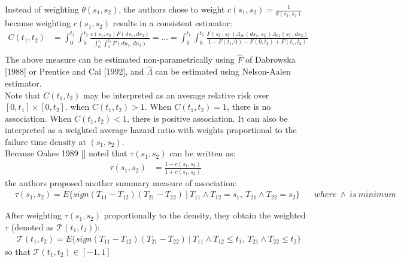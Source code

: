 \documentclass[]{article}
\begin{document}
Instead of weighting $\theta(s_1, s_2)$, the authors chose to weight $c(s_1, s_2) = \frac{1}{\theta(s_1, s_2)}$ because weighting $c(s_1, s_2)$ results in a consistent estimator:
	$$
	\begin{aligned}
		C(t_1, t_2) &= \int_0^{t_1}\int_0^{t_2} \frac{c(s_1, s_2)F(ds_1,ds_2)}{\int_0^{t_1}\int_0^{t_2} F(du_1, du_2)} = ...= \int_0^{t_1}\int_0^{t_2} \frac{F(s_1^-, s_2^-)\Lambda_{10}(ds_1, s^-_2)\Lambda_{01}(s^-_1, ds_2)}{1 - F(t_1, 0) - F(0, t_2)+ F(t_1, t_2)} \\
	\end{aligned}
	$$
	The above measure can be estimated non-parametrically using $\hat{F}$ of Dabrowska [1988] or Prentice and Cai [1992], and $\hat{\Lambda}$ can be estimated using Nelson-Aalen estimator.\\
	
Note that $C(t_1, t_2)$ may be interpreted as an average relative risk over $[0,t_1] \times [0, t_2]$. when $C(t_1, t_2)>1$. When $C(t_1, t_2)=1$, there is no association. When $C(t_1, t_2)<1$, there is positive association. It can also be interpreted as a weighted average hazard ratio with weights proportional to the failure time density at $(s_1,s_2)$.\\
	
Because Oakes 1989 [\cite{oakes1989bivariate}] noted that $\tau(s_1, s_2)$ can be written as:
	$$
	\begin{aligned}
		\tau(s_1, s_2) &= \frac{1 - c(s_1, s_2)}{1+c(s_1, s_2)}
	\end{aligned}
	$$
	the authors proposed another summary measure of association:
	$$
	\begin{aligned}
		&\tau(s_1, s_2) = E\{sign(T_{11} - T_{12}) (T_{21} - T_{22})~|~ T_{11}\wedge T_{12} = s_1,~T_{21}\wedge T_{22} = s_2  \}
		&~~~~where~\wedge~is~minimum
	\end{aligned}
	$$

After weighting $\tau(s_1, s_2)$ proportionally to the density, they obtain the weighted $\tau$ (denoted as $\mathcal{T}(t_1, t_2)$):
	$$
	\begin{aligned}
		&\mathcal{T}(t_1, t_2) = E\{sign(T_{11} - T_{12}) (T_{21} - T_{22})~|~ T_{11}\wedge T_{12} \leq t_1,~T_{21}\wedge T_{22} \leq t_2  \}
	\end{aligned}
	$$
	so that $\mathcal{T}(t_1, t_2) \in [-1,1]$
	
\end{document}
